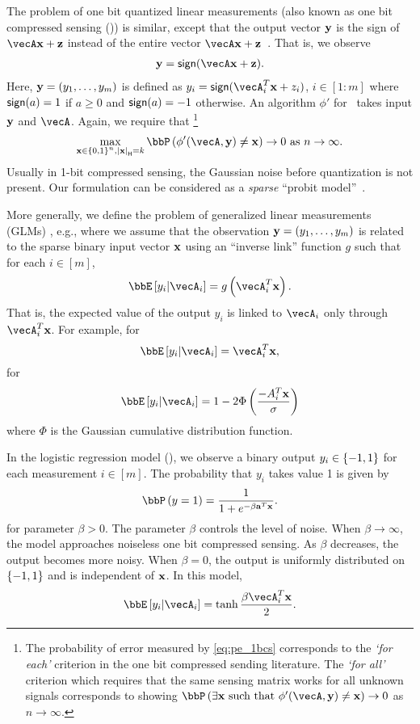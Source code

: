 The problem of one bit quantized linear measurements (also known as one bit compressed sensing (\bcs)) is similar, except that  the output vector $\mathbf{y}$ is the sign of $\vecA\bx+\bz$ instead of the entire vector $\vecA\bx+\bz$~\cite{DBLP:conf/ciss/BoufounosB08}. That is, we observe
\begin{align}
\by  = \sign{\vecA\bx+\bz}.\label{eq:bcs}
\end{align}Here, $\mathbf{y} = (y_1, \ldots, y_m)$ is defined as $y_i = \sign{\vecA_i^T \bx+z_i}$, $i\in [1:m]$ where $\mathsf{sign}(a) = 1$ if $a\geq 0$ and $\mathsf{sign}(a) = -1$ otherwise. An algorithm $\phi'$ for \bcs\ takes input  $\mathbf{y}$ and $\vecA$. Again, we require that 
\footnote{The probability
 of error measured by \eqref{eq:pe_1bcs} 
 corresponds to the {\em`for each'} criterion in the one bit compressed sending literature. The {\em`for all'} criterion which requires that the same sensing matrix works for all unknown signals corresponds to showing $\bbP\inp{\exists \bx \text{ such that }\phi'(\vecA, \by) \neq \bx}\rightarrow 0$ as $n\rightarrow \infty$.}
\begin{align}
\max_{\bx\in\inb{0,1}^n, \wh{\bx} = k}\bbP\inp{\phi'(\vecA, \by) \neq \bx}\rightarrow 0 \text{ as } n\rightarrow \infty.\label{eq:pe_1bcs}
\end{align} 
 Usually in 1-bit compressed sensing, the Gaussian noise before quantization is not present. Our  formulation  can be considered as a {\em sparse} ``probit model''~\cite{mccullagh2019generalized}.


More generally, we define the problem of generalized linear measurements (GLMs) , e.g., \cite{kakade2011efficient,vershyninPlan} where we assume that the observation $\mathbf{y} = \left(y_1, \ldots,y_m\right)$ is related to the sparse binary input vector $\mathbf{x}$ using an ``inverse link'' function $g$ such that for each $i\in [m]$, 
\begin{align}
    \bbE\insq{y_i|\vecA_i} = g\inp{\vecA_i^T\bx}.\label{eq:glm}
\end{align} 
That is, the expected value of the output $y_i$ is linked to $\vecA_i$ only through $\vecA_i^T\bx$. For example, for \spl\ $$\bbE\insq{y_i|\vecA_i} = \vecA_i^T\bx,$$ for \bcs\ $$\bbE\insq{y_i|\vecA_i} = 1-2\Phi\inp{\frac{-A_i^T\bx}{\sigma}}$$ where $\Phi$ is the Gaussian cumulative distribution function.

In the logistic regression model (\logreg), we observe a binary output $y_i\in \left\{-1, 1\right\}$ for each measurement $i\in [m]$. The probability that $y_i$ takes value 1 is given by 
\begin{align*}
\bbP\inp{y = 1} = \frac{1}{1+e^{-\beta \ba^T\bx}}.
\end{align*} for parameter $\beta>0$. The parameter $\beta$ controls the level of noise. When $\beta \rightarrow \infty$, the model approaches  noiseless one bit compressed sensing. As $\beta$ decreases, the output becomes more noisy. When $\beta = 0$, the output is uniformly distributed on $\left\{-1,1\right\}$ and is independent of $\mathbf{x}$.
In this model,  $$\bbE\insq{y_i|\vecA_i} = \tanh{\frac{\beta\vecA_i^T\bx}2}.$$ %

